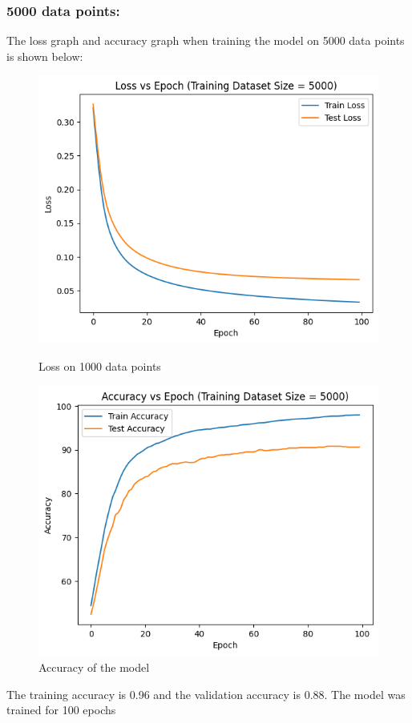 \documentclass{article}
\begin{document}
\subsubsection*{5000 data points:}
The loss graph and accuracy graph when training the model on 5000 data points is shown below:
\begin{figure}[h!]
    \centering
    \begin{minipage}{0.45\textwidth}
        \centering
        \includegraphics[width=1\textwidth]{graphs/output5000.png} %
        \caption{Loss on 1000 data points}
    \end{minipage}\hfill
    \begin{minipage}{0.45\textwidth}
        \centering
        \includegraphics[width=1\textwidth]{graphs/acc5000.png} %
        \caption{Accuracy of the model}
    \end{minipage}
\end{figure}
\newline The training accuracy is 0.96 and the validation accuracy is 0.88. The model was trained for 100 epochs\newline
\end{document}

